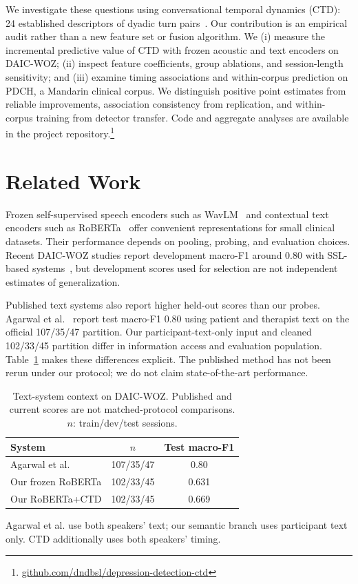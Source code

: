 \documentclass{article}
\begin{document}
We investigate these questions using conversational temporal dynamics (CTD): 24 established descriptors of dyadic turn pairs~\cite{chou2019joint,chou2021automatic}. Our contribution is an empirical audit rather than a new feature set or fusion algorithm. We (i) measure the incremental predictive value of CTD with frozen acoustic and text encoders on DAIC-WOZ; (ii) inspect feature coefficients, group ablations, and session-length sensitivity; and (iii) examine timing associations and within-corpus prediction on PDCH, a Mandarin clinical corpus. We distinguish positive point estimates from reliable improvements, association consistency from replication, and within-corpus training from detector transfer. Code and aggregate analyses are available in the project repository.\footnote{\href{https://github.com/dndbsl/depression-detection-ctd}{github.com/dndbsl/depression-detection-ctd}}

\section{Related Work}
Frozen self-supervised speech encoders such as WavLM~\cite{chen2022wavlm} and contextual text encoders such as RoBERTa~\cite{liu2019roberta} offer convenient representations for small clinical datasets. Their performance depends on pooling, probing, and evaluation choices. Recent DAIC-WOZ studies report development macro-F1 around 0.80 with SSL-based systems~\cite{wu2023ssl,li2025hierarchical}, but development scores used for selection are not independent estimates of generalization.

Published text systems also report higher held-out scores than our probes. Agarwal et al.~\cite{agarwal2024discourse} report test macro-F1 0.80 using patient and therapist text on the official 107/35/47 partition. Our participant-text-only input and cleaned 102/33/45 partition differ in information access and evaluation population. Table~\ref{tab:prior} makes these differences explicit. The published method has not been rerun under our protocol; we do not claim state-of-the-art performance.

\begin{table}[t]
\centering
\caption{Text-system context on DAIC-WOZ. Published and current scores are not matched-protocol comparisons. $n$: train/dev/test sessions.}
\label{tab:prior}
\small
\begin{tabular}{lcc}
\toprule
System & $n$ & Test macro-F1\\
\midrule
Agarwal et al.~\cite{agarwal2024discourse} & 107/35/47 & 0.80\\
Our frozen RoBERTa & 102/33/45 & 0.631\\
Our RoBERTa+CTD & 102/33/45 & 0.669\\
\bottomrule
\end{tabular}
\par\smallskip
\footnotesize Agarwal et al. use both speakers' text; our semantic branch uses participant text only. CTD additionally uses both speakers' timing.
\end{table}
\end{document}
